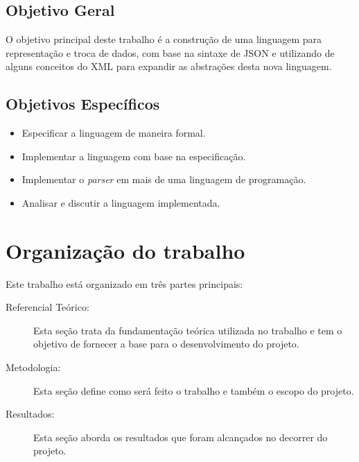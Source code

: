 \subsection{Objetivo Geral}

O objetivo principal deste trabalho é a construção de uma linguagem para
representação e troca de dados, com base na sintaxe de JSON e
utilizando de alguns conceitos do XML para expandir as abstrações 
desta nova linguagem.

\subsection{Objetivos Específicos}

\begin{itemize}
    \item Especificar a linguagem de maneira formal.
    \item Implementar a linguagem com base na especificação.
    \item Implementar o \textit{parser} em mais de uma linguagem de programação.
    \item Analisar e discutir a linguagem implementada.
\end{itemize}

\section{Organização do trabalho}

Este trabalho está organizado em três partes principais:

\begin{description}
    \item[Referencial Teórico:] Esta seção trata da fundamentação teórica
    utilizada no trabalho e tem o objetivo de fornecer a base para o desenvolvimento 
    do projeto.
    \item[Metodologia:] Esta seção define como será feito o trabalho e também
    o escopo do projeto.
    \item[Resultados:] Esta seção aborda os resultados que foram alcançados no decorrer
    do projeto.
\end{description}